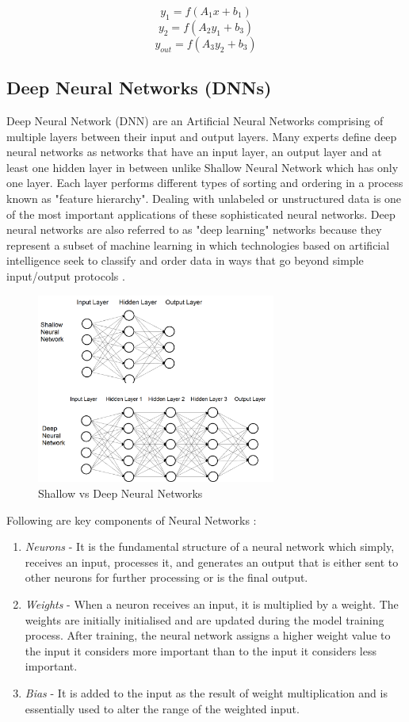 $$y_{1}=f(A_{1}x+b_{1}) $$
$$y_{2}=f(A_{2}y_{1}+b_{3})$$
$$y_{out}=f(A_{3}y_{2}+b_{3})$$

\subsection{Deep Neural Networks (DNNs)}
Deep Neural Network (DNN) are an Artificial Neural Networks comprising of multiple layers between their input and output layers. Many experts define deep neural networks as networks that have an input layer, an output layer and at least one hidden layer in between unlike Shallow Neural Network which has only one layer. Each layer performs different types of sorting and ordering in a process known as "feature hierarchy". Dealing with unlabeled or unstructured data is one of the most important applications of these sophisticated neural networks. Deep neural networks are also referred to as "deep learning" networks because they represent a subset of machine learning in which technologies based on artificial intelligence seek to classify and order data in ways that go beyond simple input/output protocols \cite{backstrom_introduction_2022}.

\begin{figure}[h!]
    \centering
    \includegraphics[width=0.7\textwidth]{img/DNN.png}
    \caption{Shallow vs Deep Neural Networks}
    \label{fig:shallow-deep-NN}
\end{figure}

Following are key components of Neural Networks \cite{backstrom_introduction_2022}:
\begin{enumerate}
    \item \textit{Neurons} - It is the fundamental structure of a neural network which simply, receives an input, processes it, and generates an output that is either sent to other neurons for further processing or is the final output.
    \item \textit{Weights} - When a neuron receives an input, it is multiplied by a weight. The weights are initially initialised and are updated during the model training process. After training, the neural network assigns a higher weight value to the input it considers more important than to the input it considers less important.
    \item \textit{Bias} - It is added to the input as the result of weight multiplication and is essentially used to alter the range of the weighted input.
\end{enumerate}

